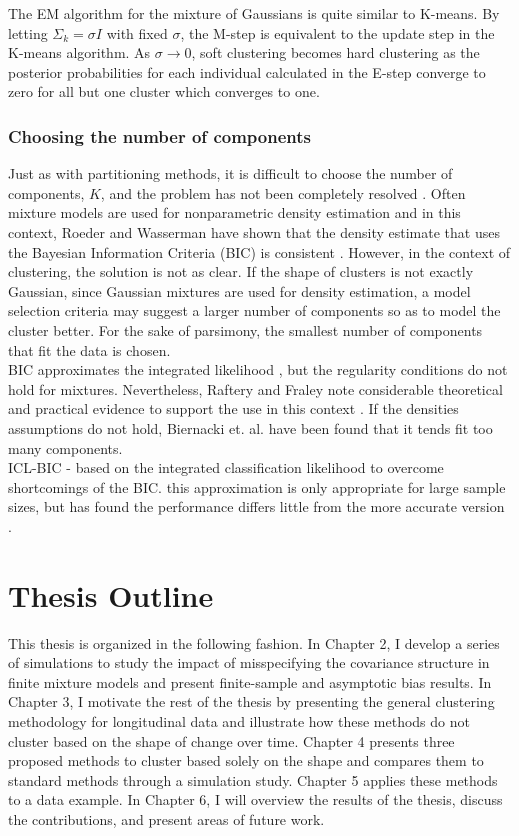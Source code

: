 The EM algorithm for the mixture of Gaussians is quite similar to K-means. By letting $\Sigma_{k} =\sigma I$ with fixed $\sigma$, the M-step is equivalent to the update step in the K-means algorithm. As $\sigma\rightarrow 0$, soft clustering becomes hard clustering as the posterior probabilities for each individual calculated in the E-step converge to zero for all but one cluster which converges to one. 

\subsubsection{Choosing the number of components}
Just as with partitioning methods, it is difficult to choose the number of components, $K$, and the problem has not been completely resolved \cite{mclachlan2000}. Often mixture models are used for nonparametric density estimation and in this context, Roeder and Wasserman have shown that the density estimate that uses the Bayesian Information Criteria (BIC) is consistent \cite{roeder1997}. However, in the context of clustering, the solution is not as clear. If the shape of clusters is not exactly Gaussian, since Gaussian mixtures are used for density estimation, a model selection criteria may suggest a larger number of components so as to model the cluster better. For the sake of parsimony, the smallest number of components that fit the data is chosen.\\

BIC approximates the integrated likelihood \cite{schwarz1978}, but the regularity conditions do not hold for mixtures. Nevertheless, Raftery and Fraley note considerable theoretical and practical evidence to support the use in this context \cite{fraley1998}. If the densities assumptions do not hold, Biernacki et. al. \cite{biernacki2000} have been found that it tends fit too many components. \\

ICL-BIC - based on the integrated classification likelihood to overcome shortcomings of the BIC. this approximation is only appropriate for large sample sizes, but has found the performance differs little from the more accurate version \cite{biernacki2000}.

\section{Thesis Outline}
This thesis is organized in the following fashion. In Chapter 2, I develop a series of simulations to study the impact of misspecifying the covariance structure in finite mixture models and present finite-sample and asymptotic bias results. In Chapter 3, I motivate the rest of the thesis by presenting the general clustering methodology for longitudinal data and illustrate how these methods do not cluster based on the shape of change over time. Chapter 4 presents three proposed methods to cluster based solely on the shape and compares them to standard methods through a simulation study. Chapter 5 applies these methods to a data example. In Chapter 6, I will overview the results of the thesis, discuss the contributions, and present areas of future work. 

